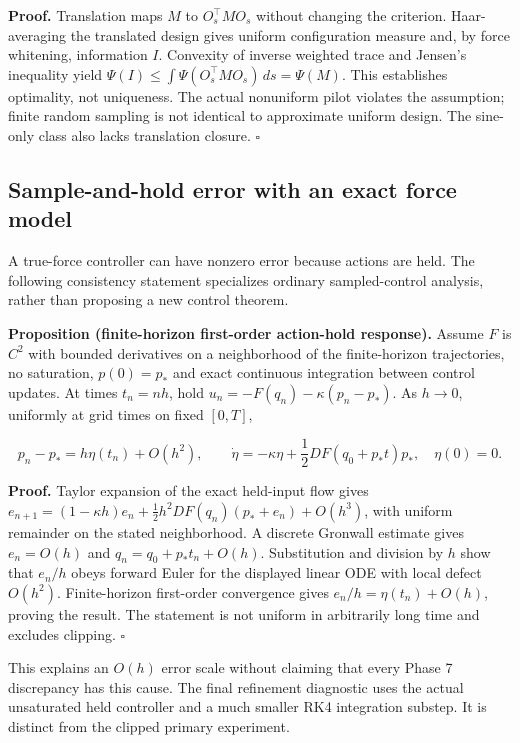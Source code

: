 \documentclass[
  10pt,
]{article}
\begin{document}
\textbf{Proof.} Translation maps \(M\) to \(O_s^\top M O_s\) without
changing the criterion. Haar-averaging the translated design gives
uniform configuration measure and, by force whitening, information
\(I\). Convexity of inverse weighted trace and Jensen's inequality yield
\(\Psi(I)\le\int\Psi(O_s^\top MO_s)\,ds=\Psi(M)\). This establishes
optimality, not uniqueness. The actual nonuniform pilot violates the
assumption; finite random sampling is not identical to approximate
uniform design. The sine-only class also lacks translation closure.
\(\square\)

\hypertarget{sample-and-hold-error-with-an-exact-force-model}{%
\subsection{Sample-and-hold error with an exact force
model}\label{sample-and-hold-error-with-an-exact-force-model}}

A true-force controller can have nonzero error because actions are held.
The following consistency statement specializes ordinary sampled-control
analysis, rather than proposing a new control theorem.

\textbf{Proposition (finite-horizon first-order action-hold response).}
Assume \(F\) is \(C^2\) with bounded derivatives on a neighborhood of
the finite-horizon trajectories, no saturation, \(p(0)=p_*\) and exact
continuous integration between control updates. At times \(t_n=nh\),
hold \(u_n=-F(q_n)-\kappa(p_n-p_*)\). As \(h\to0\), uniformly at grid
times on fixed \([0,T]\),

\[p_n-p_*=h\eta(t_n)+O(h^2),\qquad \dot\eta=-\kappa\eta+\frac12DF(q_0+p_*t)p_*,\quad\eta(0)=0.\]

\textbf{Proof.} Taylor expansion of the exact held-input flow gives
\(e_{n+1}=(1-\kappa h)e_n+\frac12h^2DF(q_n)(p_*+e_n)+O(h^3)\), with
uniform remainder on the stated neighborhood. A discrete Gronwall
estimate gives \(e_n=O(h)\) and \(q_n=q_0+p_*t_n+O(h)\). Substitution
and division by \(h\) show that \(e_n/h\) obeys forward Euler for the
displayed linear ODE with local defect \(O(h^2)\). Finite-horizon
first-order convergence gives \(e_n/h=\eta(t_n)+O(h)\), proving the
result. The statement is not uniform in arbitrarily long time and
excludes clipping. \(\square\)

This explains an \(O(h)\) error scale without claiming that every Phase
7 discrepancy has this cause. The final refinement diagnostic uses the
actual unsaturated held controller and a much smaller RK4 integration
substep. It is distinct from the clipped primary experiment.
\end{document}
